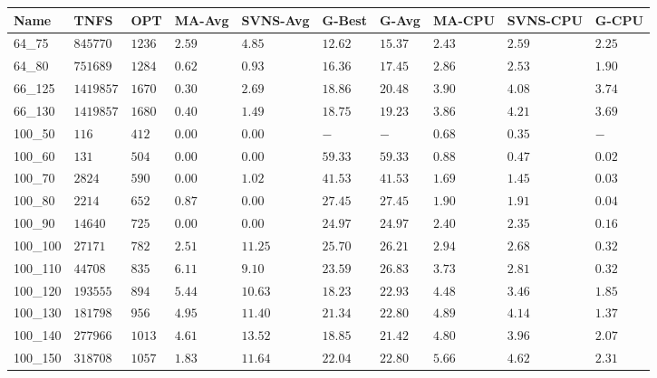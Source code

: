 \begin{center}
    \begin{table}[]
    \centering
    \begin{adjustwidth}{-0.4in}{-1in}
    \begin{tabular}{|lll|l|l|ll|lll|}
\hline
Name     & TNFS        & OPT    & MA-Avg & SVNS-Avg & G-Best & G-Avg & MA-CPU  & SVNS-CPU & G-CPU \\
\hline
64\_75   & $845770   $ & $1236$ & $2.59$ & $4.85 $  & $12.62$    & $15.37$   & $2.43 $ & $2.59 $  & $2.25$ \\
64\_80   & $751689   $ & $1284$ & $0.62$ & $0.93 $  & $16.36$    & $17.45$   & $2.86 $ & $2.53 $  & $1.90$ \\
\hline
66\_125  & $1419857  $ & $1670$ & $0.30$ & $2.69 $  & $18.86$    & $20.48$   & $3.90 $ & $4.08 $  & $3.74$ \\
66\_130  & $1419857  $ & $1680$ & $0.40$ & $1.49 $  & $18.75$    & $19.23$   & $3.86 $ & $4.21 $  & $3.69$ \\
\hline
100\_50  & $116      $ & $412 $ & $\bm{0.00}$ & $\bm{0.00} $  & $-    $    & $-    $   & $0.68 $ & $0.35 $  & $-   $ \\
100\_60  & $131      $ & $504 $ & $\bm{0.00}$ & $\bm{0.00} $  & $59.33$    & $59.33$   & $0.88 $ & $0.47 $  & $0.02$ \\
100\_70  & $2824     $ & $590 $ & $\bm{0.00}$ & $1.02 $  & $41.53$    & $41.53$   & $1.69 $ & $1.45 $  & $0.03$ \\
100\_80  & $2214     $ & $652 $ & $0.87$ & $\bm{0.00} $  & $27.45$    & $27.45$   & $1.90 $ & $1.91 $  & $0.04$ \\
100\_90  & $14640    $ & $725 $ & $\bm{0.00}$ & $\bm{0.00} $  & $24.97$    & $24.97$   & $2.40 $ & $2.35 $  & $0.16$ \\
100\_100 & $27171    $ & $782 $ & $2.51$ & $11.25$  & $25.70$    & $26.21$   & $2.94 $ & $2.68 $  & $0.32$ \\
100\_110 & $44708    $ & $835 $ & $6.11$ & $9.10 $  & $23.59$    & $26.83$   & $3.73 $ & $2.81 $  & $0.32$ \\
100\_120 & $193555   $ & $894 $ & $5.44$ & $10.63$  & $18.23$    & $22.93$   & $4.48 $ & $3.46 $  & $1.85$ \\
100\_130 & $181798   $ & $956 $ & $4.95$ & $11.40$  & $21.34$    & $22.80$   & $4.89 $ & $4.14 $  & $1.37$ \\
100\_140 & $277966   $ & $1013$ & $4.61$ & $13.52$  & $18.85$    & $21.42$   & $4.80 $ & $3.96 $  & $2.07$ \\
100\_150 & $318708   $ & $1057$ & $1.83$ & $11.64$  & $22.04$    & $22.80$   & $5.66 $ & $4.62 $  & $2.31$ \\

\end{tabular}
\end{adjustwidth}
\end{table}
\end{center}
